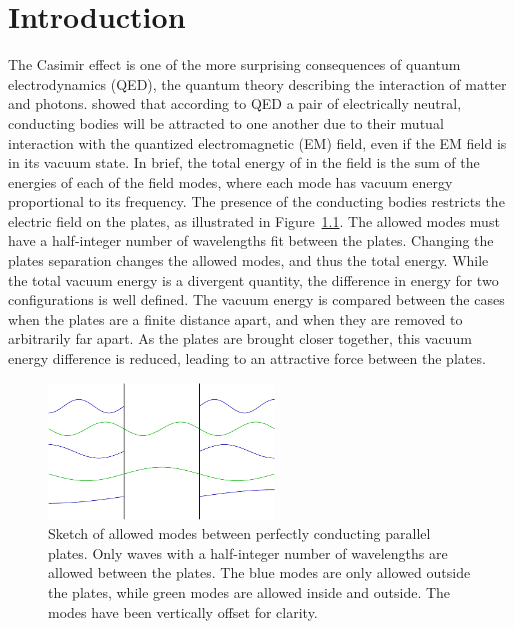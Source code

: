 \chapter{Introduction}
\label{ch:introduction}

The Casimir effect is one of the more surprising consequences of quantum electrodynamics (QED), the quantum theory
describing the interaction of matter and photons.
\citet{Casimir1948} showed that according to QED a pair of  electrically neutral, conducting bodies will be attracted to one another due to their mutual interaction
with the quantized electromagnetic (EM) field, even if the EM field is in its vacuum state.  
In brief, the total energy of in the field is the sum of the energies of each of the field modes, 
where each mode has vacuum energy proportional to its frequency.   
The presence of the conducting bodies restricts the electric field on the plates, as illustrated in Figure~\ref{fig:Casimir_sketch}.
The allowed modes must have a half-integer number of wavelengths fit between the plates.  
Changing the plates separation changes the allowed modes, and thus the total energy. 
While the total vacuum energy is a divergent quantity, the difference in energy for two configurations
is well defined.  
The vacuum energy is compared between the cases when the plates are a finite distance apart, and when
they are removed to arbitrarily far apart.  
As the plates are brought closer together, this vacuum energy difference is reduced, leading to an attractive force
between the plates.  

\begin{figure}
\center
\includegraphics[width=6cm]{fig/intro/twoplanes_wave}
\caption[Allowed modes between parallel plates]
{Sketch of allowed modes between perfectly conducting parallel plates. 
 Only waves with a half-integer number of wavelengths are allowed between the plates.
The blue modes are only allowed outside the plates, while green modes are allowed inside
and outside.  The modes have been vertically offset for clarity.  }
\label{fig:Casimir_sketch}
\end{figure}

